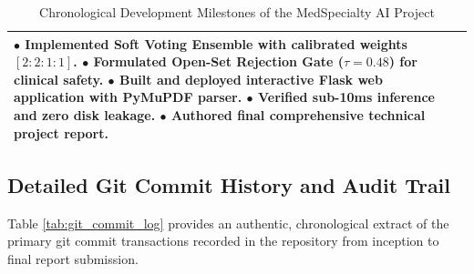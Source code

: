 \begin{table}[H]
\begin{tabularx}{\linewidth}{|>{\raggedright\arraybackslash}p{2.6cm}|>{\raggedright\arraybackslash}p{2.4cm}|>{\raggedright\arraybackslash}X|}
$\bullet$ Implemented Soft Voting Ensemble with calibrated weights $[2:2:1:1]$. \newline
$\bullet$ Formulated Open-Set Rejection Gate ($\tau = 0.48$) for clinical safety. \newline
$\bullet$ Built and deployed interactive Flask web application with PyMuPDF parser. \newline
$\bullet$ Verified sub-10ms inference and zero disk leakage. \newline
$\bullet$ Authored final comprehensive technical project report. \\
\hline
\end{tabularx}
\caption{Chronological Development Milestones of the MedSpecialty AI Project}
\label{tab:development_milestones}
\end{table}

\subsection{Detailed Git Commit History and Audit Trail}

Table \ref{tab:git_commit_log} provides an authentic, chronological extract of the primary git commit transactions recorded in the repository from inception to final report submission.

